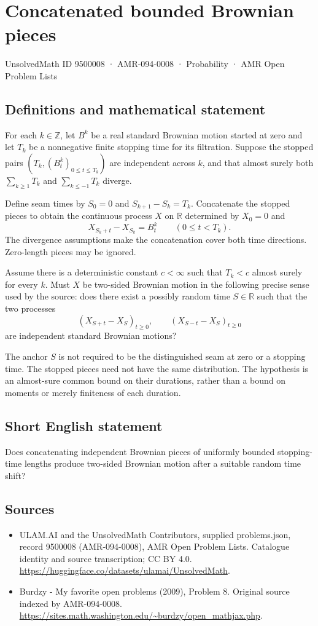 \documentclass[11pt,a4paper]{article}
\begin{document}
\section*{Concatenated bounded Brownian pieces}\label{9500008}
{\small UnsolvedMath ID 9500008 · AMR-094-0008 · Probability · AMR Open Problem Lists}
\subsection{Definitions and mathematical statement}
For each $k\in\mathbb Z$, let $B^k$ be a real standard Brownian motion started at zero and let $T_k$ be a nonnegative finite stopping time for its filtration. Suppose the stopped pairs $(T_k,(B^k_t)_{0\le t\le T_k})$ are independent across $k$, and that almost surely both $\sum_{k\ge1}T_k$ and $\sum_{k\le-1}T_k$ diverge.

Define seam times by $S_0=0$ and $S_{k+1}-S_k=T_k$. Concatenate the stopped pieces to obtain the continuous process $X$ on $\mathbb R$ determined by $X_0=0$ and
\[
X_{S_k+t}-X_{S_k}=B^k_t\qquad(0\le t<T_k).
\]
The divergence assumptions make the concatenation cover both time directions. Zero-length pieces may be ignored.

Assume there is a deterministic constant $c<\infty$ such that $T_k<c$ almost surely for every $k$. Must $X$ be two-sided Brownian motion in the following precise sense used by the source: does there exist a possibly random time $S\in\mathbb R$ such that the two processes
\[
(X_{S+t}-X_S)_{t\ge0},\qquad(X_{S-t}-X_S)_{t\ge0}
\]
are independent standard Brownian motions?

The anchor $S$ is not required to be the distinguished seam at zero or a stopping time. The stopped pieces need not have the same distribution. The hypothesis is an almost-sure common bound on their durations, rather than a bound on moments or merely finiteness of each duration.
\subsection{Short English statement}
Does concatenating independent Brownian pieces of uniformly bounded stopping-time lengths produce two-sided Brownian motion after a suitable random time shift?
\subsection{Sources}
\begin{itemize}
\item[S1] ULAM.AI and the UnsolvedMath Contributors, supplied problems.json, record 9500008 (AMR-094-0008), AMR Open Problem Lists. Catalogue identity and source transcription; CC BY 4.0.
\url{https://huggingface.co/datasets/ulamai/UnsolvedMath}.
\item[S2] Burdzy - My favorite open problems (2009), Problem 8. Original source indexed by AMR-094-0008.
\url{https://sites.math.washington.edu/~burdzy/open_mathjax.php}.
\end{itemize}
\end{document}
